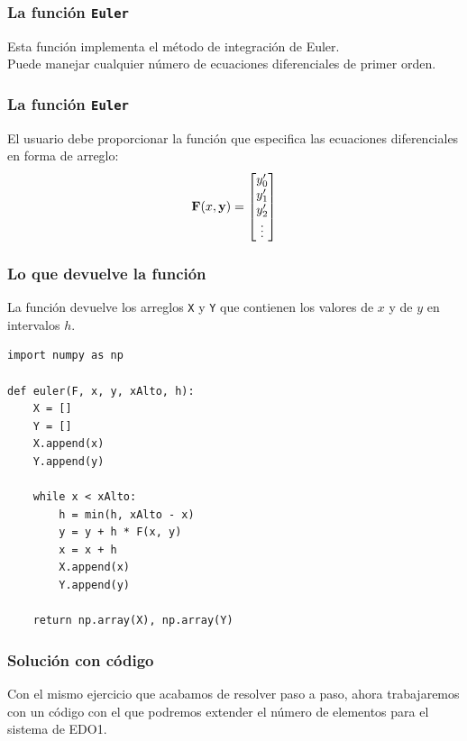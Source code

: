 \documentclass[12pt]{beamer}
\begin{document}
\begin{frame}
\frametitle{La función \texttt{Euler}}
Esta función implementa el \textcolor{ao}{método de integración de Euler}.
\\
\bigskip
\pause
Puede manejar cualquier número de ecuaciones diferenciales de primer orden.
\end{frame}
\begin{frame}
\frametitle{La función \texttt{Euler}}
El usuario debe proporcionar la función  que especifica las ecuaciones diferenciales en forma de arreglo:
\pause
\renewcommand*{\arraystretch}{0.7}
\begin{align*}
\mathbf{F} (x, \mathbf{y}) = 
\begin{bmatrix}
{y}^{\prime}_{0} \\
{y}^{\prime}_{1} \\
{y}^{\prime}_{2} \\
\vdots
\end{bmatrix}
\end{align*}
\end{frame}
\begin{frame}
\frametitle{Lo que devuelve la función}
La función devuelve los arreglos \texttt{X} y \texttt{Y} que contienen los valores de $x$ y de $y$ en intervalos $h$.
\end{frame}
\begin{frame}
\begin{lstlisting}[caption=Método de Euler]
import numpy as np

def euler(F, x, y, xAlto, h):
    X = []
    Y = []
    X.append(x)
    Y.append(y)

    while x < xAlto:
        h = min(h, xAlto - x)
        y = y + h * F(x, y)
        x = x + h
        X.append(x)
        Y.append(y)

    return np.array(X), np.array(Y)
\end{lstlisting}
\end{frame}
\begin{frame}
\frametitle{Solución con código}
Con el mismo ejercicio que acabamos de resolver paso a paso, ahora trabajaremos con un código con el que podremos extender el número de elementos para el sistema de EDO1.
\end{frame}
\end{document}
